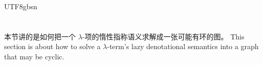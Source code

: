 \begin{CJK*}{UTF8}{gbsn}
  \section{}\label{sec:bridge}
  \ifTablambdaChinese
  本节讲的是如何把一个 $\lambda$-项的惰性指称语义求解成一张可能有环的图。
  \else
  This section is about how to solve a $\lambda$-term's lazy denotational semantics into a graph that may be cyclic.
  \fi


\end{CJK*}
